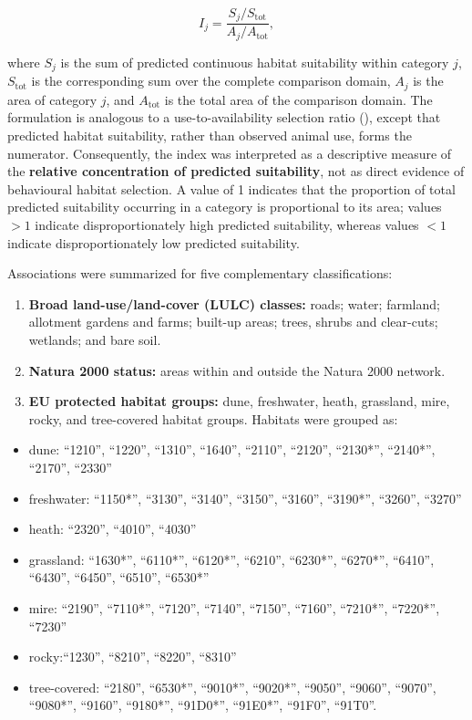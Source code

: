\documentclass[
  openany]{book}
\begin{document}
\[
I_j =
\frac{S_j / S_{\mathrm{tot}}}
     {A_j / A_{\mathrm{tot}}},
\]

where \(S_j\) is the sum of predicted continuous habitat suitability within category \(j\), \(S_{\mathrm{tot}}\) is the corresponding sum over the complete comparison domain, \(A_j\) is the area of category \(j\), and \(A_{\mathrm{tot}}\) is the total area of the comparison domain. The formulation is analogous to a use-to-availability selection ratio (), except that predicted habitat suitability, rather than observed animal use, forms the numerator. Consequently, the index was interpreted as a descriptive measure of the \textbf{relative concentration of predicted suitability}, not as direct evidence of behavioural habitat selection. A value of 1 indicates that the proportion of total predicted suitability occurring in a category is proportional to its area; values \(>1\) indicate disproportionately high predicted suitability, whereas values \(<1\) indicate disproportionately low predicted suitability.

Associations were summarized for five complementary classifications:

\begin{enumerate}
\def\labelenumi{\arabic{enumi}.}
\item
  \textbf{Broad land-use/land-cover (LULC) classes:} roads; water; farmland; allotment gardens and farms; built-up areas; trees, shrubs and clear-cuts; wetlands; and bare soil.
\item
  \textbf{Natura 2000 status:} areas within and outside the Natura 2000 network.
\item
  \textbf{EU protected habitat groups:} dune, freshwater, heath, grassland, mire, rocky, and tree-covered habitat groups. Habitats were grouped as:
\end{enumerate}

\begin{itemize}
\item
  dune: ``1210'', ``1220'', ``1310'', ``1640'', ``2110'', ``2120'', ``2130*'', ``2140*'', ``2170'', ``2330''
\item
  freshwater: ``1150*'', ``3130'', ``3140'', ``3150'', ``3160'', ``3190*'', ``3260'', ``3270''
\item
  heath: ``2320'', ``4010'', ``4030''
\item
  grassland: ``1630*'', ``6110*'', ``6120*'', ``6210'', ``6230*'', ``6270*'', ``6410'', ``6430'', ``6450'', ``6510'', ``6530*''
\item
  mire: ``2190'', ``7110*'', ``7120'', ``7140'', ``7150'', ``7160'', ``7210*'', ``7220*'', ``7230''
\item
  rocky:``1230'', ``8210'', ``8220'', ``8310''
\item
  tree-covered: ``2180'', ``6530*'', ``9010*'', ``9020*'', ``9050'', ``9060'', ``9070'', ``9080*'', ``9160'', ``9180*'', ``91D0*'', ``91E0*'', ``91F0'', ``91T0''.
\end{itemize}
\end{document}
